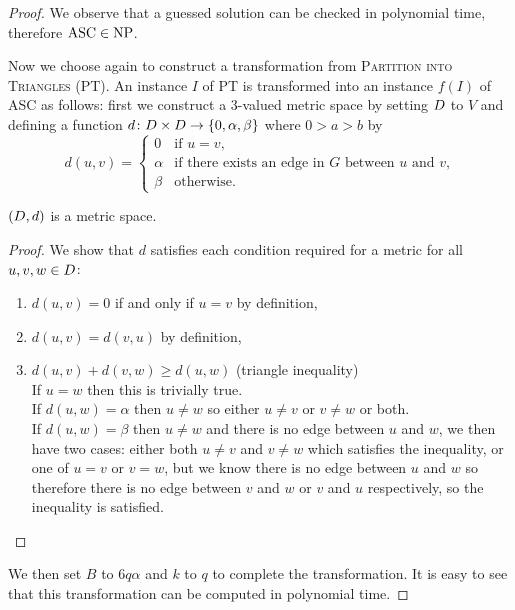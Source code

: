 \begin{proof}
  We observe that a guessed solution can be checked in polynomial time,
  therefore $\text{ASC} \in \text{NP}$.

  Now we choose again to construct a transformation from \textsc{Partition
    into Triangles} (PT).  An instance $I$ of PT is transformed into an
  instance $f(I)$ of ASC as follows: first we construct a 3-valued metric
  space by setting $D$ to $V$ and defining a function $d \colon D
  \times D \to \{0,\alpha,\beta\}$ where $0 > a > b$ by
  \begin{equation*}
    d(u,v) = \begin{cases}
      0 & \text{if $u=v$,}\\
      \alpha & \text{if there exists an edge in $G$ between $u$ and $v$,}\\
      \beta & \text{otherwise.}
    \end{cases}
  \end{equation*}

  \begin{lem}
    \label{lem:3-val-met}
    $(D,d)$ is a metric space.
  \end{lem}
  
  \begin{proof}
    We show that $d$ satisfies each condition required for a metric for all
    $u,v,w \in D$:
    \begin{enumerate}
    \item $d(u,v)=0$ if and only if $u=v$ by definition,
    \item $d(u,v)=d(v,u)$ by definition,
    \item $d(u,v)+d(v,w) \geq d(u,w)$ (triangle inequality)\\
      If $u=w$ then this is trivially true.\\
      If $d(u,w)=\alpha$ then $u \neq w$ so either $u \neq v$ or $v \neq w$ or
      both.\\
      If $d(u,w)=\beta$ then $u \neq w$ and there is no edge between $u$ and
      $w$, we then have two cases: either both $u \neq v$ and $v \neq w$ which
      satisfies the inequality, or one of $u=v$ or $v=w$, but we know there is
      no edge between $u$ and $w$ so therefore there is no edge between $v$
      and $w$ or $v$ and $u$ respectively, so the inequality is satisfied.
    \end{enumerate}
  \end{proof}

  We then set $B$ to $6q\alpha$ and $k$ to $q$ to complete the transformation.
  It is easy to see that this transformation can be computed in polynomial
  time.


\end{proof}
